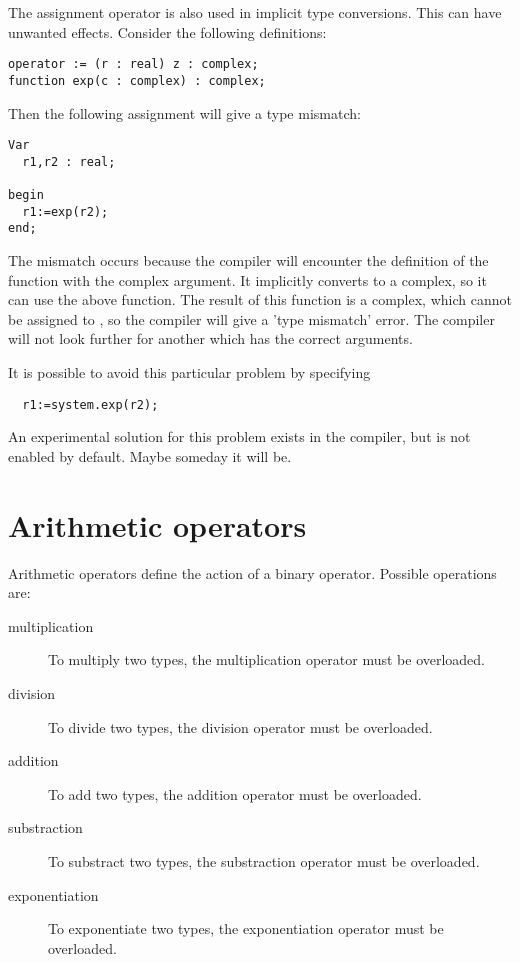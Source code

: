 \begin{remark}
The assignment operator is also used in implicit type conversions. This can
have unwanted effects. Consider the following definitions:
\begin{verbatim}
operator := (r : real) z : complex;
function exp(c : complex) : complex;
\end{verbatim}
Then the following assignment will give a type mismatch:
\begin{verbatim}
Var
  r1,r2 : real;

begin
  r1:=exp(r2);
end;
\end{verbatim}
The mismatch occurs because the compiler will encounter the definition of the  function
with the complex argument. It implicitly converts  to a complex, so it can
use the above  function. The result of this function is a complex,
which cannot be assigned to , so the compiler will give a 'type mismatch'
error. The compiler will not look further for another  which has
the correct arguments.

It is possible to avoid this particular problem by specifying
\begin{verbatim}
  r1:=system.exp(r2);
\end{verbatim}
An experimental solution for this problem exists in the compiler, but is
not enabled by default. Maybe someday it will be.
\end{remark}

\section{Arithmetic operators}
Arithmetic operators define the action of a binary operator. Possible
operations are:
\begin{description}
\item[multiplication] To multiply two types, the \var{*} multiplication
operator must be overloaded.
\item[division] To divide two types, the \var{/} division
operator must be overloaded.
\item[addition] To add two types, the \var{+} addition
operator must be overloaded.
\item[substraction] To substract two types, the \var{-} substraction
operator must be overloaded.
\item[exponentiation] To exponentiate two types, the \var{**} exponentiation
operator must be overloaded.
\end{description}

